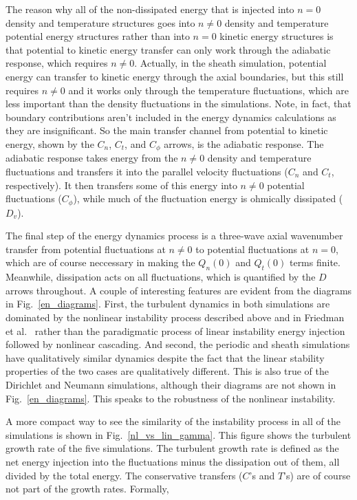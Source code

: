 \documentclass[showpacs,preprintnumbers,amsmath,amssymb,superscriptaddress,aip]{revtex4-1}
\begin{document}
The reason why all of the non-dissipated energy that is injected into $n=0$ density and temperature structures goes into 
$n \ne 0$ density and temperature potential energy structures rather than into $n=0$
kinetic energy structures is that potential to kinetic energy transfer can only work through the adiabatic response, which requires $n \ne 0$. Actually, in the sheath simulation, potential energy
can transfer to kinetic energy through the axial boundaries, but this still requires $n \ne 0$ and it works only through the temperature fluctuations, which are less important than the density
fluctuations in the simulations. Note, in fact, that boundary contributions aren't included in the energy dynamics calculations as they are insignificant.
So the main transfer channel from potential to kinetic energy, shown by the $C_n$, $C_t$, and $C_\phi$ arrows, is the adiabatic response. The adiabatic response takes energy
from the $n \ne 0$ density and temperature fluctuations and transfers it into the parallel velocity fluctuations ($C_n$ and $C_t$, respectively). It then transfers some of this energy into
$n \ne 0$ potential fluctuations ($C_\phi$), while much of the fluctuation energy is ohmically dissipated ($D_v$).

The final step of the energy dynamics process is a three-wave axial wavenumber transfer from potential fluctuations at $n \ne 0$ to potential fluctuations at $n=0$, which are of course neccessary
in making the $Q_n(0)$ and $Q_t(0)$ terms finite. Meanwhile, dissipation acts on all fluctuations, which is quantified by the $D$ arrows throughout. A couple of interesting features are evident
from the diagrams in Fig.~\ref{en_diagrams}. 
First, the turbulent dynamics in both simulations are dominated by the nonlinear instability process described above and in Friedman et al.~\cite{friedman2012b}
rather than the paradigmatic process of linear instability energy injection followed by nonlinear cascading. And second,
the periodic and sheath simulations have qualitatively similar dynamics despite the fact that the linear stability properties of the two cases
are qualitatively different. This is also true of the Dirichlet and Neumann simulations, although their diagrams are not shown in Fig.~\ref{en_diagrams}. 
This speaks to the robustness of the nonlinear instability.

A more compact way to see the similarity of the instability process in all of the simulations is shown in Fig.~\ref{nl_vs_lin_gamma}. 
This figure shows the turbulent growth rate of the five simulations. 
The turbulent growth rate is defined as the net energy injection
into the fluctuations minus the dissipation out of them, all divided by the total energy. The conservative transfers ($C$'s and $T$'s) are of course not part of the growth rates.
Formally, 
\end{document}
